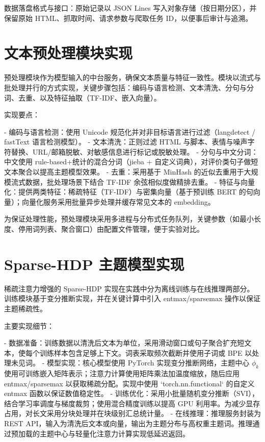 数据落盘格式与接口：原始记录以 JSON Lines 写入对象存储（按日期分区），并保留原始 HTML、抓取时间、请求参数与爬取任务 ID，以便事后审计与追溯。

\section{文本预处理模块实现}
\label{sec:impl_preprocessing}

预处理模块作为模型输入的中台服务，确保文本质量与特征一致性。模块以流式与批处理并行的方式实现，关键步骤包括：编码与语言检测、文本清洗、分句与分词、去重、以及特征抽取（TF-IDF、嵌入向量）。

实现要点：

- 编码与语言检测：使用 Unicode 规范化并对非目标语言进行过滤（langdetect / fastText 语言检测模型）。
- 文本清洗：正则过滤 HTML 与脚本、表情与噪声字符替换、URL/邮箱脱敏、对敏感信息进行标记或脱敏处理。 
- 分句与中文分词：中文使用 rule-based+统计的混合分词（jieba + 自定义词典），对评价类句子做短文本聚合以提高主题模型效果。 
- 去重：采用基于 MinHash 的近似去重用于大规模流式数据，批处理场景下结合 TF-IDF 余弦相似度做精排去重。 
- 特征与向量化：提供两类特征：稀疏特征（TF-IDF）与密集向量（基于预训练 BERT 的句向量）；向量化服务采用批量异步处理并缓存常见文本的 embedding。 

为保证处理性能，预处理模块采用多进程与分布式任务队列，关键参数（如最小长度、停用词列表、聚合窗口）由配置文件管理，便于实验对比。

\section{Sparse-HDP 主题模型实现}
\label{sec:impl_sparse_hdp}

稀疏注意力增强的 Sparse-HDP 实现在实践中分为离线训练与在线推理两部分。训练模块基于变分推断实现，并在关键计算中引入 entmax/sparsemax 操作以保证主题稀疏性。

主要实现细节：

- 数据准备：训练数据以清洗后文本为单位，采用滑动窗口或句子聚合扩充短文本，使每个训练样本包含足够上下文。词表采取频次截断并使用子词或 BPE 以处理未见词。
- 模型实现：核心模型使用 PyTorch 实现变分推断网络，主题中心 $\phi_k$ 使用可训练嵌入矩阵表示；注意力计算使用矩阵乘法加温度缩放，随后应用 entmax/sparsemax 以获取稀疏分配。实现中使用 `torch.nn.functional` 的自定义 entmax 函数以保证数值稳定性。
- 训练优化：采用小批量随机变分推断（SVI），结合学习率调度与梯度裁剪；使用混合精度训练以提高 GPU 利用率。为减少显存占用，对长文采用分块处理并在块级别汇总统计量。
- 在线推理：推理服务封装为 REST API，输入为清洗后文本或向量，输出为主题分布与高权重主题词。推理通过预加载的主题中心与轻量化注意力计算实现低延迟返回。

